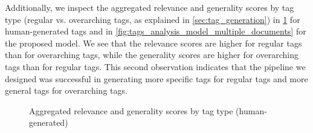 Additionally, we inspect the aggregated relevance and generality scores by tag type (regular vs. overarching tags, as explained in \cref{sec:tag_generation}) in \cref{fig:tags_analysis_human_multiple_documents} for human-generated tags and in \cref{fig:tags_analysis_model_multiple_documents} for the proposed model. We see that the relevance scores are higher for regular tags than for overarching tags, while the generality scores are higher for overarching tags than for regular tags. This second observation indicates that the pipeline we designed was successful in generating more specific tags for regular tags and more general tags for overarching tags.

\begin{figure}[h]
    \centering
    \hfill
    \caption{Aggregated relevance and generality scores by tag type (human-generated)}
    \label{fig:tags_analysis_human_multiple_documents}
\end{figure}

